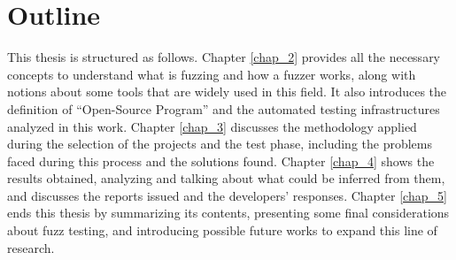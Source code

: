 \section{Outline}
This thesis is structured as follows. Chapter \ref{chap_2} provides all the necessary concepts to understand what is fuzzing and how a fuzzer works, along with notions about some tools that are widely used in this field. It also introduces the definition of ``Open-Source Program'' and the automated testing infrastructures analyzed in this work. Chapter \ref{chap_3} discusses the methodology applied during the selection of the projects and the test phase, including the problems faced during this process and the solutions found. Chapter \ref{chap_4} shows the results obtained, analyzing and talking about what could be inferred from them, and discusses the reports issued and the developers' responses. Chapter \ref{chap_5} ends this thesis by summarizing its contents, presenting some final considerations about fuzz testing, and introducing possible future works to expand this line of research.
